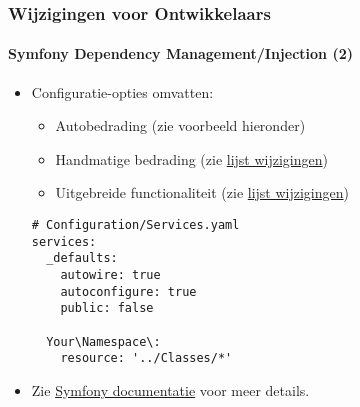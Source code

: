 \begin{frame}[fragile]
	\frametitle{Wijzigingen voor Ontwikkelaars}
	\framesubtitle{Symfony Dependency Management/Injection (2)}

	\lstset{basicstyle=\tiny\ttfamily}

	\begin{itemize}
		\item Configuratie-opties omvatten:

			\begin{itemize}
				\item Autobedrading (zie voorbeeld hieronder)
				\item Handmatige bedrading
					(zie \href{https://docs.typo3.org/c/typo3/cms-core/master/en-us/Changelog/10.0/Feature-84112-SymfonyDependencyInjectionForCoreAndExtbase.html}{lijst wijzigingen})
				\item Uitgebreide functionaliteit
					(zie \href{https://docs.typo3.org/c/typo3/cms-core/master/en-us/Changelog/10.0/Feature-84112-SymfonyDependencyInjectionForCoreAndExtbase.html}{lijst wijzigingen})
			\end{itemize}


\begin{lstlisting}
# Configuration/Services.yaml
services:
  _defaults:
    autowire: true
    autoconfigure: true
    public: false

  Your\Namespace\:
    resource: '../Classes/*'
\end{lstlisting}

		\item Zie \href{https://symfony.com/doc/current/service_container.html}{Symfony documentatie} voor meer details.

	\end{itemize}

\end{frame}


